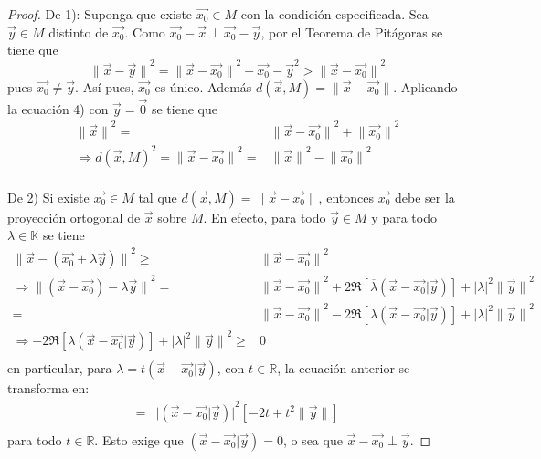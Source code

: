 \documentclass[12pt]{report}
\theoremstyle{largebreak}
\newcommand\abs[1]{\ensuremath{\big|#1\big|}}
\newcommand\norm[1]{\ensuremath{\|#1\|}}
\newcommand\pint[2]{\ensuremath{\left(#1\big| #2\right)}}
\newcommand\conj[1]{\ensuremath{\overline{#1}}}
\begin{document}
    \begin{proof}
        De 1): Suponga que existe $\vec{x_0}\in M$ con la condición especificada. Sea $\vec{y}\in M$ distinto de $\vec{x_0}$. Como $\vec{x_0}-\vec{x}\perp\vec{x_0}-\vec{y}$, por el Teorema de Pitágoras se tiene que
        \begin{equation}
            \norm{\vec{x}-\vec{y}}^2=\norm{\vec{x}-\vec{x_0}}^2+\vec{x_0}-\vec{y}^2>\norm{\vec{x}-\vec{x_0}}^2
        \end{equation}
        pues $\vec{x_0}\neq \vec{y}$. Así pues, $\vec{x_0}$ es único. Además $d(\vec{x},M)=\norm{\vec{x}-\vec{x_0}}$. Aplicando la ecuación 4) con $\vec{y}=\vec{0}$ se tiene que
        \begin{equation*}
            \begin{split}
                \norm{\vec{x}}^2=&\norm{\vec{x}-\vec{x_0}}^2+\norm{\vec{x_0}}^2\\
                \Rightarrow d(\vec{x},M)^2=\norm{\vec{x}-\vec{x_0}}^2=&\norm{\vec{x}}^2-\norm{\vec{x_0}}^2\\
            \end{split}
        \end{equation*}
        
        De 2) Si existe $\vec{x_0}\in M$ tal que $d(\vec{x},M)=\norm{\vec{x}-\vec{x_0}}$, entonces $\vec{x_0}$ debe ser la proyección ortogonal de $\vec{x}$ sobre $M$. En efecto, para todo $\vec{y}\in M$ y para todo $\lambda\in\mathbb{K}$ se tiene
        \begin{equation}
            \begin{split}
                \norm{\vec{x}-(\vec{x_0}+\lambda\vec{y})}^2\geq&\norm{\vec{x}-\vec{x_0}}^2\\
                \Rightarrow \norm{(\vec{x}-\vec{x_0})-\lambda\vec{y}}^2=&\norm{\vec{x}-\vec{x_0}}^2+2\Re[\conj{\lambda} \pint{\vec{x}-\vec{x_0}}{\vec{y}}]+\abs{\lambda}^2\norm{\vec{y}}^2\\
                =&\norm{\vec{x}-\vec{x_0}}^2-2\Re[\lambda\pint{\vec{x}-\vec{x_0}}{\vec{y}}]+\abs{\lambda}^2\norm{\vec{y}}^2\\
                \Rightarrow -2\Re[\lambda\pint{\vec{x}-\vec{x_0}}{\vec{y}}]+\abs{\lambda}^2\norm{\vec{y}}^2\geq& 0\\
            \end{split}
        \end{equation}
        en particular, para $\lambda=t\pint{\vec{x}-\vec{x_0}}{\vec{y}}$, con $t\in\mathbb{R}$, la ecuación anterior se transforma en:
        \begin{equation*}
            \begin{split}
                =&\abs{\pint{\vec{x}-\vec{x_0}}{\vec{y}}}^2\left[-2t+t^2\norm{\vec{y}}\right]\\
            \end{split}
        \end{equation*}
        para todo $t\in\mathbb{R}$. Esto exige que $\pint{\vec{x}-\vec{x_0}}{\vec{y}}=0$, o sea que $\vec{x}-\vec{x_0}\perp \vec{y}$.
    \end{proof}
\end{document}
